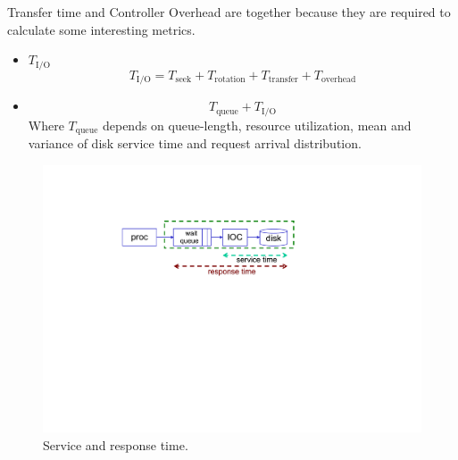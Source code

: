 \begin{itemize}
    Transfer time and Controller Overhead are together because they are required to calculate some interesting metrics.
    \begin{itemize}
        \item {} $T_{\text{I/O}}$
        \begin{equation}
            T_{\text{I/O}} = T_{\text{seek}} + T_{\text{rotation}} + T_{\text{transfer}} + T_{\text{overhead}}
        \end{equation}

        \item {}
        \begin{equation}
            T_{\text{queue}} + T_{\text{I/O}}
        \end{equation}
        Where $T_{\text{queue}}$ depends on queue-length, resource utilization, mean and variance of disk service time and request arrival distribution.
    \end{itemize}
    \newpage
    \begin{figure}[!htp]
        \centering
        \includegraphics[width=.7\textwidth]{img/performance-hdd-1.pdf}
        \caption{Service and response time.}
    \end{figure}
\end{itemize}

